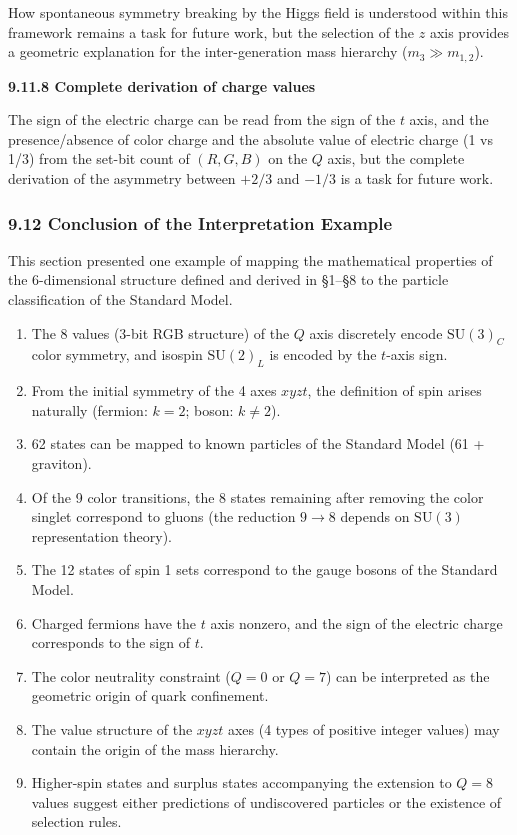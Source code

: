 \documentclass[
  a4paper,11pt]{article}
\providecommand{\tightlist}{%
  \setlength{\itemsep}{0pt}\setlength{\parskip}{0pt}}
\theoremstyle{definition}
\theoremstyle{remark}
\begin{document}
How spontaneous symmetry breaking by the Higgs field is understood
within this framework remains a task for future work, but the selection
of the \(z\) axis provides a geometric explanation for the
inter-generation mass hierarchy (\(m_3 \gg m_{1,2}\)).

\textbf{9.11.8 Complete derivation of charge values}

The sign of the electric charge can be read from the sign of the \(t\)
axis, and the presence/absence of color charge and the absolute value of
electric charge (1 vs 1/3) from the set-bit count of \((R,G,B)\) on the
\(Q\) axis, but the complete derivation of the asymmetry between
\(+2/3\) and \(-1/3\) is a task for future work.

\subsubsection{9.12 Conclusion of the Interpretation
Example}\label{conclusion-of-the-interpretation-example}

This section presented one example of mapping the mathematical
properties of the 6-dimensional structure defined and derived in §1--§8
to the particle classification of the Standard Model.

\begin{enumerate}
\def\labelenumi{\arabic{enumi}.}
\tightlist
\item
  The 8 values (3-bit RGB structure) of the \(Q\) axis discretely encode
  \(\mathrm{SU}(3)_C\) color symmetry, and isospin \(\mathrm{SU}(2)_L\)
  is encoded by the \(t\)-axis sign.
\item
  From the initial symmetry of the 4 axes \(xyzt\), the definition of
  spin arises naturally (fermion: \(k = 2\); boson: \(k \neq 2\)).
\item
  62 states can be mapped to known particles of the Standard Model (61 +
  graviton).
\item
  Of the 9 color transitions, the 8 states remaining after removing the
  color singlet correspond to gluons (the reduction \(9 \to 8\) depends
  on \(\mathrm{SU}(3)\) representation theory).
\item
  The 12 states of spin 1 sets correspond to the gauge bosons of the
  Standard Model.
\item
  Charged fermions have the \(t\) axis nonzero, and the sign of the
  electric charge corresponds to the sign of \(t\).
\item
  The color neutrality constraint (\(Q = 0\) or \(Q = 7\)) can be
  interpreted as the geometric origin of quark confinement.
\item
  The value structure of the \(xyzt\) axes (4 types of positive integer
  values) may contain the origin of the mass hierarchy.
\item
  Higher-spin states and surplus states accompanying the extension to
  \(Q = 8\) values suggest either predictions of undiscovered particles
  or the existence of selection rules.
\end{enumerate}
\end{document}
